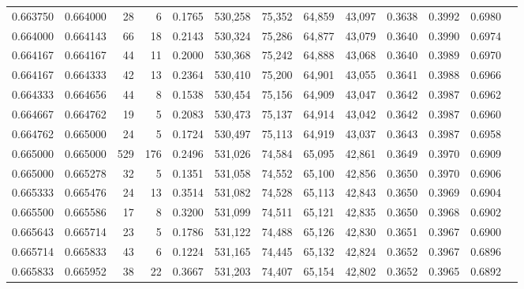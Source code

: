 \begin{tabular}{rrrrrrrrrrrrr}
0.663750 & 0.664000 &    28 &   6 &                                     0.1765 & 530,258 &  75,352 &  64,859 &  43,097 & 0.3638 & 0.3992 & 0.6980 \\
0.664000 & 0.664143 &    66 &  18 &                                     0.2143 & 530,324 &  75,286 &  64,877 &  43,079 & 0.3640 & 0.3990 & 0.6974 \\
0.664167 & 0.664167 &    44 &  11 &                                     0.2000 & 530,368 &  75,242 &  64,888 &  43,068 & 0.3640 & 0.3989 & 0.6970 \\
0.664167 & 0.664333 &    42 &  13 &                                     0.2364 & 530,410 &  75,200 &  64,901 &  43,055 & 0.3641 & 0.3988 & 0.6966 \\
0.664333 & 0.664656 &    44 &   8 &                                     0.1538 & 530,454 &  75,156 &  64,909 &  43,047 & 0.3642 & 0.3987 & 0.6962 \\
0.664667 & 0.664762 &    19 &   5 &                                     0.2083 & 530,473 &  75,137 &  64,914 &  43,042 & 0.3642 & 0.3987 & 0.6960 \\
0.664762 & 0.665000 &    24 &   5 &                                     0.1724 & 530,497 &  75,113 &  64,919 &  43,037 & 0.3643 & 0.3987 & 0.6958 \\
0.665000 & 0.665000 &   529 & 176 &                                     0.2496 & 531,026 &  74,584 &  65,095 &  42,861 & 0.3649 & 0.3970 & 0.6909 \\
0.665000 & 0.665278 &    32 &   5 &                                     0.1351 & 531,058 &  74,552 &  65,100 &  42,856 & 0.3650 & 0.3970 & 0.6906 \\
0.665333 & 0.665476 &    24 &  13 &                                     0.3514 & 531,082 &  74,528 &  65,113 &  42,843 & 0.3650 & 0.3969 & 0.6904 \\
0.665500 & 0.665586 &    17 &   8 &                                     0.3200 & 531,099 &  74,511 &  65,121 &  42,835 & 0.3650 & 0.3968 & 0.6902 \\
0.665643 & 0.665714 &    23 &   5 &                                     0.1786 & 531,122 &  74,488 &  65,126 &  42,830 & 0.3651 & 0.3967 & 0.6900 \\
0.665714 & 0.665833 &    43 &   6 &                                     0.1224 & 531,165 &  74,445 &  65,132 &  42,824 & 0.3652 & 0.3967 & 0.6896 \\
0.665833 & 0.665952 &    38 &  22 &                                     0.3667 & 531,203 &  74,407 &  65,154 &  42,802 & 0.3652 & 0.3965 & 0.6892 \\

\end{tabular}
